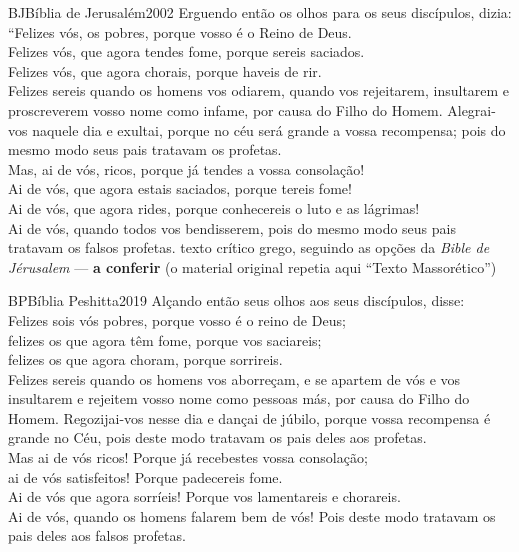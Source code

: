 \begin{traducao}{BJ}{Bíblia de Jerusalém}{2002}
Erguendo então os olhos para os seus discípulos, dizia:\\
“Felizes vós, os pobres, porque vosso é o Reino de Deus.\\
Felizes vós, que agora tendes fome, porque sereis saciados.\\
Felizes vós, que agora chorais, porque haveis de rir.\\
Felizes sereis quando os homens vos odiarem, quando vos rejeitarem,
insultarem e proscreverem vosso nome como infame, por causa do Filho do Homem.
Alegrai-vos naquele dia e exultai, porque no céu será grande a vossa
recompensa; pois do mesmo modo seus pais tratavam os profetas.\\
Mas, ai de vós, ricos, porque já tendes a vossa consolação!\\
Ai de vós, que agora estais saciados, porque tereis fome!\\
Ai de vós, que agora rides, porque conhecereis o luto e as lágrimas!\\
Ai de vós, quando todos vos bendisserem, pois do mesmo modo seus pais
tratavam os falsos profetas.
%
  {texto crítico grego, seguindo as opções da \emph{Bible de Jérusalem} —
   \textbf{a conferir} (o material original repetia aqui \enquote{Texto Massorético})}
\end{traducao}

\begin{traducao}{BP}{Bíblia Peshitta}{2019}
Alçando então seus olhos aos seus discípulos, disse:\\
Felizes sois vós pobres, porque vosso é o reino de Deus;\\
felizes os que agora têm fome, porque vos saciareis;\\
felizes os que agora choram, porque sorrireis.\\
Felizes sereis quando os homens vos aborreçam, e se apartem de vós e vos
insultarem e rejeitem vosso nome como pessoas más, por causa do Filho do
Homem. Regozijai-vos nesse dia e dançai de júbilo, porque vossa
recompensa é grande no Céu, pois deste modo tratavam os pais deles aos
profetas.\\
Mas ai de vós ricos! Porque já recebestes vossa consolação;\\
ai de vós satisfeitos! Porque padecereis fome.\\
Ai de vós que agora sorríeis! Porque vos lamentareis e chorareis.\\
Ai de vós, quando os homens falarem bem de vós! Pois deste modo tratavam
os pais deles aos falsos profetas.
\end{traducao}

